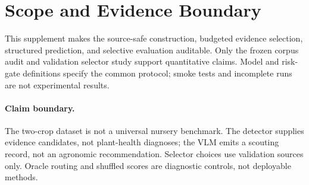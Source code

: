 \section{Scope and Evidence Boundary}

This supplement makes the source-safe construction, budgeted evidence
selection, structured prediction, and selective evaluation auditable.  Only
the frozen corpus audit and validation selector study support quantitative
claims.  Model and risk-gate definitions specify the common protocol; smoke
tests and incomplete runs are not experimental results.

\paragraph{Claim boundary.}
The two-crop dataset is not a universal nursery benchmark.  The detector
supplies evidence candidates, not plant-health diagnoses; the VLM emits a
scouting record, not an agronomic recommendation.  Selector choices use
validation sources only.  Oracle routing and shuffled scores are diagnostic
controls, not deployable methods.
